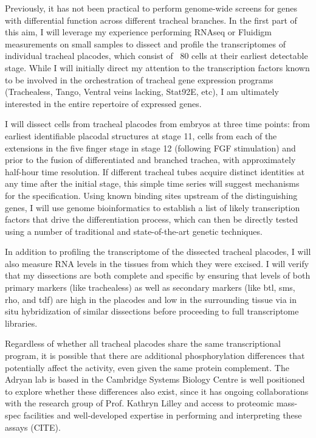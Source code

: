 \documentclass{proposal}
\begin{document}
Previously, it has not been practical to perform genome-wide screens for genes with differential function across different tracheal branches.  In the first part of this aim, I will leverage my experience performing RNAseq or Fluidigm measurements on small samples to dissect and profile the transcriptomes of individual tracheal placodes, which consist of ~80 cells at their earliest detectable stage.  While I will initially direct my attention to the transcription factors known to be involved in the orchestration of tracheal gene expression programs (Trachealess, Tango, Ventral veins lacking, Stat92E, etc), I am ultimately interested in the entire repertoire of expressed genes. 

I will dissect cells from tracheal placodes from embryos at three time points: from earliest identifiable placodal structures at stage 11, cells from each of the extensions in the five finger stage in stage 12 (following FGF stimulation) and prior to the fusion of differentiated and branched trachea, with approximately half-hour time resolution.  If different tracheal tubes acquire distinct identities at any time after the initial stage, this simple time series will suggest mechanisms for the specification. Using known binding sites upstream of the distinguishing genes, I will use genome bioinformatics to establish a list of likely transcription factors that drive the differentiation process, which can then be directly tested using a number of traditional and state-of-the-art genetic techniques.

In addition to profiling the transcriptome of the dissected tracheal placodes, I will also measure RNA levels in the tissues from which they were excised.  I will verify that my dissections are both complete and specific by ensuring that levels of both primary markers (like trachealess) as well as secondary markers (like btl, sms, rho, and tdf) are high in the placodes and low in the surrounding tissue via in situ hybridization of similar dissections before proceeding to full transcriptome libraries.

Regardless of whether all tracheal placodes share the same transcriptional program, it is possible that there are additional phosphorylation differences that potentially affect the activity, even given the same protein complement.  The Adryan lab is based in the Cambridge Systems Biology Centre is well positioned to explore whether these differences also exist, since it has ongoing collaborations with the research group of Prof. Kathryn Lilley and access to proteomic mass-spec facilities and well-developed expertise in performing and interpreting these assays (CITE).
\end{document}
